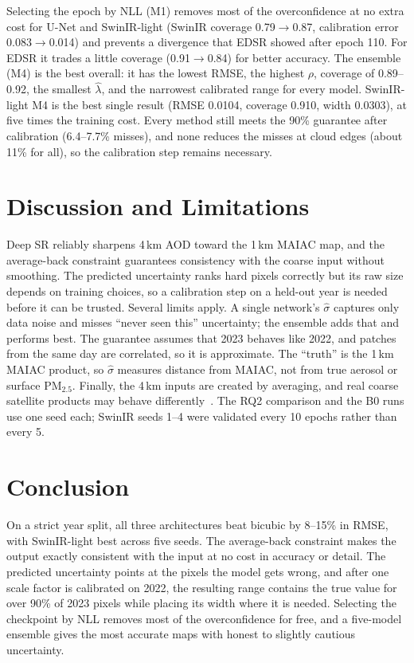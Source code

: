 \documentclass[conference]{IEEEtran}
\begin{document}
Selecting the epoch by NLL (M1) removes most of the overconfidence at no extra cost for U-Net and SwinIR-light (SwinIR coverage 0.79\(\to\)0.87, calibration error 0.083\(\to\)0.014) and prevents a divergence that EDSR showed after epoch 110. For EDSR it trades a little coverage (0.91\(\to\)0.84) for better accuracy. The ensemble (M4) is the best overall: it has the lowest RMSE, the highest \(\rho\), coverage of 0.89--0.92, the smallest \(\hat\lambda\), and the narrowest calibrated range for every model. SwinIR-light M4 is the best single result (RMSE 0.0104, coverage 0.910, width 0.0303), at five times the training cost. Every method still meets the 90\% guarantee after calibration (6.4--7.7\% misses), and none reduces the misses at cloud edges (about 11\% for all), so the calibration step remains necessary.


\section{Discussion and Limitations}
Deep SR reliably sharpens 4\,km AOD toward the 1\,km MAIAC map, and the average-back constraint guarantees consistency with the coarse input without smoothing. The predicted uncertainty ranks hard pixels correctly but its raw size depends on training choices, so a calibration step on a held-out year is needed before it can be trusted. Several limits apply. A single network's \(\hat\sigma\) captures only data noise and misses ``never seen this'' uncertainty; the ensemble adds that and performs best. The guarantee assumes that 2023 behaves like 2022, and patches from the same day are correlated, so it is approximate. The ``truth'' is the 1\,km MAIAC product, so \(\hat\sigma\) measures distance from MAIAC, not from true aerosol or surface PM$_{2.5}$. Finally, the 4\,km inputs are created by averaging, and real coarse satellite products may behave differently~\cite{aybar2026sen2sr}. The RQ2 comparison and the B0 runs use one seed each; SwinIR seeds 1--4 were validated every 10 epochs rather than every 5.

\section{Conclusion}
On a strict year split, all three architectures beat bicubic by 8--15\% in RMSE, with SwinIR-light best across five seeds. The average-back constraint makes the output exactly consistent with the input at no cost in accuracy or detail. The predicted uncertainty points at the pixels the model gets wrong, and after one scale factor is calibrated on 2022, the resulting range contains the true value for over 90\% of 2023 pixels while placing its width where it is needed. Selecting the checkpoint by NLL removes most of the overconfidence for free, and a five-model ensemble gives the most accurate maps with honest to slightly cautious uncertainty.

\clearpage


\end{document}
